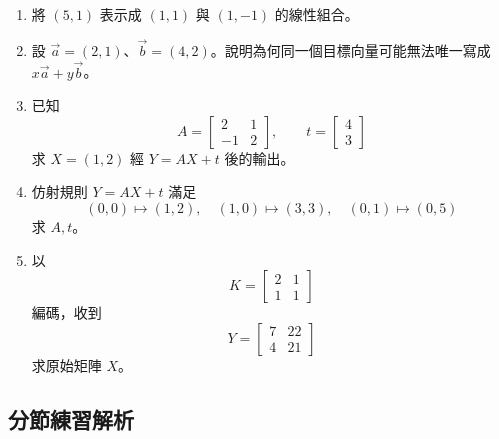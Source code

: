 \documentclass[11pt,a4paper]{article}
\begin{document}
\begin{enumerate}
\def\labelenumi{\arabic{enumi}.}
\item
  將 \((5,1)\) 表示成 \((1,1)\) 與 \((1,-1)\) 的線性組合。
\item
  設 \(\vec a=(2,1)\)、\(\vec b=(4,2)\)。說明為何同一個目標向量可能無法唯一寫成 \(x\vec a+y\vec b\)。
\item
  已知
  \[A=\begin{bmatrix}2&1\\-1&2\end{bmatrix},\qquad t=\begin{bmatrix}4\\3\end{bmatrix}\]
  求 \(X=(1,2)\) 經 \(Y=AX+t\) 後的輸出。
\item
  仿射規則 \(Y=AX+t\) 滿足
  \[(0,0)\mapsto(1,2),\quad (1,0)\mapsto(3,3),\quad (0,1)\mapsto(0,5)\]
  求 \(A,t\)。
\item
  以
  \[K=\begin{bmatrix}2&1\\1&1\end{bmatrix}\]
  編碼，收到
  \[Y=\begin{bmatrix}7&22\\4&21\end{bmatrix}\]
  求原始矩陣 \(X\)。
\end{enumerate}

\subsection{分節練習解析}\label{ux5206ux7bc0ux7df4ux7fd2ux89e3ux6790-6}
\end{document}
